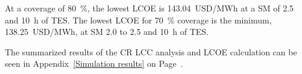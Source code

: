 At a coverage of \SI{80}{\percent}, the lowest \ac{LCOE} is \SI{143.04}{USD/MWh} at a \ac{SM} of 2.5 and \SI{10}{h} of \ac{TES}. The lowest \ac{LCOE} for \SI{70}{\percent} coverage is the minimum, \SI{138.25}{USD/MWh}, at \ac{SM} 2.0 to 2.5 and \SI{10}{h} of \ac{TES}.

The summarized results of the \ac{CR} \ac{LCC} analysis and \ac{LCOE} calculation can be seen in Appendix~\ref{Simulation results} on Page~\pageref{Simulation results}.